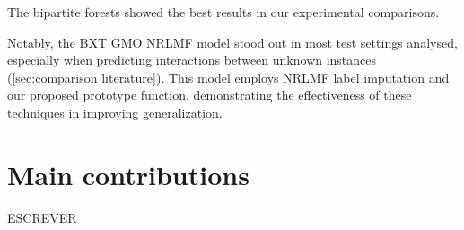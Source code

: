 \begin{enumerate}
    The bipartite forests showed the best results in our experimental comparisons.

    Notably, the BXT GMO NRLMF model stood out in most test settings analysed, especially when predicting interactions between unknown instances (\autoref{sec:comparison literature}). This model employs NRLMF label imputation and our proposed prototype function, demonstrating the effectiveness of these techniques in improving generalization.





\end{enumerate}

\section{Main contributions}

ESCREVER %

% 
% 


